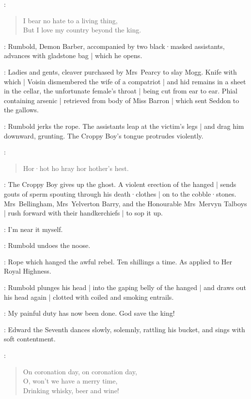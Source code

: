 \CroppyBoy:
\begin{verse}
    I bear no hate to a living thing,\\
    But I love my country beyond the king.
\end{verse}

:
Rumbold,
Demon Barber,
accompanied by two black·masked assistants,
advances with gladstone bag |
which he opens.

\RumboldDemonBarber:
Ladies and gents,
cleaver purchased by Mrs~Pearcy to slay Mogg.
Knife with which |
Voisin dismembered the wife of a compatriot |
and hid remains in a sheet in the cellar,
%
the unfortunate female's throat |
being cut from ear to ear.
Phial containing arsenic |
retrieved from body of Miss Barron |
which sent Seddon to the gallows.

:
Rumbold jerks the rope.
The assistants leap at the victim's legs |
and drag him downward,
grunting.
The Croppy Boy's tongue protrudes violently.

\CroppyBoy:
\begin{verse}
    Hor·hot ho hray hor hother's hest.
\end{verse}

:
The Croppy Boy gives up the ghost.
A violent erection of the hanged |
sends gouts of sperm spouting through his death·clothes |
on to the cobble·stones.
Mrs~Bellingham,
Mrs~Yelverton Barry,
%
and the Honourable Mrs~Mervyn Talboys |
rush forward with their handkerchiefs |
to sop it up.

\Rumbold:
I'm near it myself.

:
Rumbold undoes the noose.

\Rumbold:
Rope which hanged the awful rebel.
Ten shillings a time.
As applied to Her Royal Highness.

:
Rumbold plunges his head |
into the gaping belly of the hanged |
and draws out his head again |
clotted with coiled and smoking entrails.

\Rumbold:
My painful duty has now been done.
God save the king!

:
Edward the Seventh dances slowly,
solemnly,
rattling his bucket,
%
and sings with soft contentment.

\EdwardSeventh:
\begin{verse}
    On coronation day, on coronation day,\\
    O, won't we have a merry time,\\
    Drinking whisky, beer and wine!
\end{verse}

